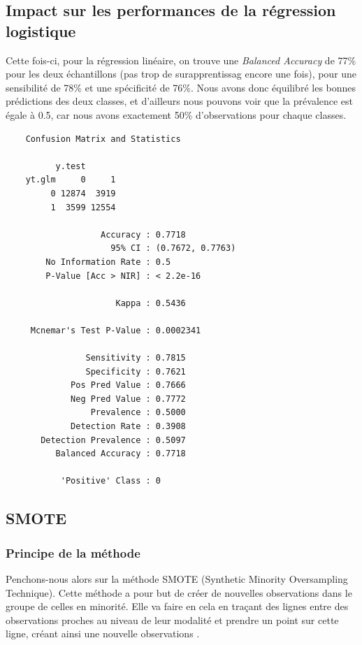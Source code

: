 \documentclass{article}
\begin{document}
\subsection{Impact sur les performances de la régression logistique}

Cette fois-ci, pour la régression linéaire, on trouve une \emph{Balanced Accuracy} de 77\% pour les deux échantillons (pas trop de surapprentissag encore une fois), pour une sensibilité de 78\% et une spécificité de 76\%. Nous avons donc équilibré les bonnes prédictions des deux classes, et d'ailleurs nous pouvons voir que la prévalence est égale à 0.5, car nous avons exactement 50\% d'observations pour chaque classes. 

\begin{multicols}{2}
    \begin{verbatim}
    Confusion Matrix and Statistics

          y.test
    yt.glm     0     1
         0 12874  3919
         1  3599 12554

                   Accuracy : 0.7718          
                     95% CI : (0.7672, 0.7763)
        No Information Rate : 0.5             
        P-Value [Acc > NIR] : < 2.2e-16       

                      Kappa : 0.5436          

     Mcnemar's Test P-Value : 0.0002341       

                Sensitivity : 0.7815          
                Specificity : 0.7621          
             Pos Pred Value : 0.7666          
             Neg Pred Value : 0.7772          
                 Prevalence : 0.5000          
             Detection Rate : 0.3908          
       Detection Prevalence : 0.5097          
          Balanced Accuracy : 0.7718          

           'Positive' Class : 0
    \end{verbatim}
\end{multicols}

\subsection{SMOTE}

\subsubsection{Principe de la méthode}

Penchons-nous alors sur la méthode SMOTE (Synthetic Minority Oversampling Technique). Cette méthode a pour but de créer de nouvelles observations dans le groupe de celles en minorité. Elle va faire en cela en traçant des lignes entre des observations proches au niveau de leur modalité et prendre un point sur cette ligne, créant ainsi une nouvelle observations \cite{smote}. 
\end{document}
